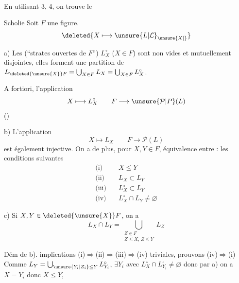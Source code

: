  En utilisant \uline{} 3, \uline{} 4, on trouve le

\uline{Scholie} Soit $F$  une figure. 
\[
\deleted{X\longmapsto\unsure{L|\mathcal{L}}_{\unsure{X|{}}}}
\]

a) Les   (``strates ouvertes de $F$'') $L_X^{\circ}$ ($X\in F$) sont non vides et mutuellement disjointes, elles forment  une partition de $L_{\deleted{\unsure{X}}F}=\bigcup_{X\in F}L_X=\bigcup_{X\in F}L_X^{\circ}$.

 A fortiori, l'application
\[
 X\longmapsto L_X^{\circ}\qquad F\longrightarrow\unsure{\mathcal P|P}(L)
\]
()

b) L'application
\[
 X\longmapsto L_X\qquad F\longrightarrow\mathcal P(L)
\]
est également injective. \inserted{[donc si $X,Y$ sont comp. et $L_X=L_Y$ on a $X=Y$)} On a de plus, pour $X,Y\in F$, équivalence entre : les conditions suivantes
\[
\begin{aligned}
 \text{(i)}\quad &X\leq Y\\
 \text{(ii)}\quad &L_X\subset L_Y\\
 \text{(iii)}\quad &L_X^{\circ}\subset L_Y\\
 \text{(iv)}\quad &L_X^{\circ}\cap L_Y\ne\varnothing
\end{aligned}
\]

c) Si $X,Y\in\deleted{\unsure{X}}F$, on a
\[
 L_X\cap L_Y=\bigcup_{\substack{Z\in F\\ Z\leq X,\,Z\leq Y}}L_Z
\]

Dém de b).  implications (i)$\Rightarrow$(ii)$\Rightarrow$(iii)$\Rightarrow$(iv) triviales, prouvons (iv)$\Rightarrow$(i) Comme $L_Y=\bigcup_{\unsure{Y_i|Z_i}\leq Y} L_{Y_i}^{\circ}$,  $\exists Y_i$ avec $L_X^{\circ}\cap L_{Y_i}^{\circ}\ne\varnothing$ donc par a) on a $X=Y_i$ donc $X\leq Y$, 
